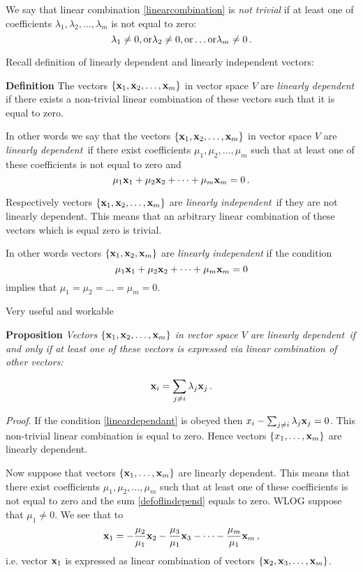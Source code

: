 \documentclass[12pt]{article}
\numberwithin{equation}{section}
\begin{document}
We say that linear combination \eqref{linearcombination} is {\it not trivial} if at least one of  coefficients $\lambda_1,\lambda_2,\dots,\lambda_m$ is not equal to zero:
                    $$
         \lambda_1\not=0, {\rm or}\lambda_2\not=0,{\rm or}\dots {\rm or} \lambda_m\not=0\,.
                    $$

Recall definition of linearly dependent and linearly independent vectors:

{\bf Definition} The vectors $\{{\bf x}_1,{\bf x}_2,\dots,{\bf x}_m\}$ in vector space $V$ are {\it linearly dependent\,}
if there exists a non-trivial linear combination of these vectors such that it is equal to zero.

In other words we say that the vectors $\{{\bf x}_1,{\bf x}_2,\dots,{\bf x}_m\}$ in vector space $V$ are {\it linearly dependent\,} if there exist
coefficients $\mu_1,\mu_2,\dots,\mu_m$ such that at least one of these coefficients is not equal to zero and
               \begin{equation}\label{defoflindepend}
             \mu_1{\bf x}_1+\mu_2{\bf x}_2+\dots+\mu_m{\bf x}_m=0\,.
                 \end{equation}

Respectively  vectors $\{{\bf x}_1,{\bf x}_2,\dots,{\bf x}_m\}$ are {\it linearly independent\,} if they are not linearly dependent.
  This means that an arbitrary linear combination of these vectors which is equal  zero is trivial.

In other words
vectors $\{{\bf x}_1,{\bf x}_2,{\bf x}_m\}$ are {\it linearly independent} if the condition
                      $$
                      \mu_1{\bf x}_1+\mu_2{\bf x}_2+\dots+\mu_m{\bf x}_m=0
                      $$
implies that $\mu_1=\mu_2=\dots=\mu_m=0$.



Very useful and workable

{\bf Proposition }
{\it Vectors $\{{\bf x}_1,{\bf x}_2,\dots,{\bf x}_m\}$ in vector space $V$ are {\it linearly dependent\,}
if and only if at least one of these vectors is expressed via linear combination of other vectors:}

               \begin{equation*}\label{lineardependant}
             {\bf x}_i=\sum_{j\not =i}\lambda_j{\bf x}_j\,.
               \end{equation*}
{\footnotesize
{\sl Proof}. If the condition \eqref{lineardependant} is obeyed then $x_i-\sum_{j\not =i}\lambda_j{\bf x}_j=0$. This non-trivial linear combination is equal to zero. Hence vectors $\{x_1,\dots,{\bf x}_m\}$ are linearly dependent.

   Now suppose that vectors $\{{\bf x}_1,\dots,{\bf x}_m\}$ are linearly dependent. This means that
   there exist
coefficients $\mu_1,\mu_2,\dots,\mu_m$ such that at least one of these coefficients is not equal to zero and
   the sum \eqref{defoflindepend} equals to zero. WLOG suppose that $\mu_1\not=0$. We see that
   to             $$
   {\bf x}_1=-{\mu_2\over \mu_1}{\bf x}_2-{\mu_3\over \mu_1}{\bf x}_3-\dots-{\mu_m\over \mu_1}{\bf x}_m\,,
                  $$
    i.e. vector ${\bf x}_1$ is expressed as linear combination of vectors $\{{\bf x}_2,{\bf x}_3,\dots,{\bf x}_m\}$\finish.

\m
}
\end{document}
